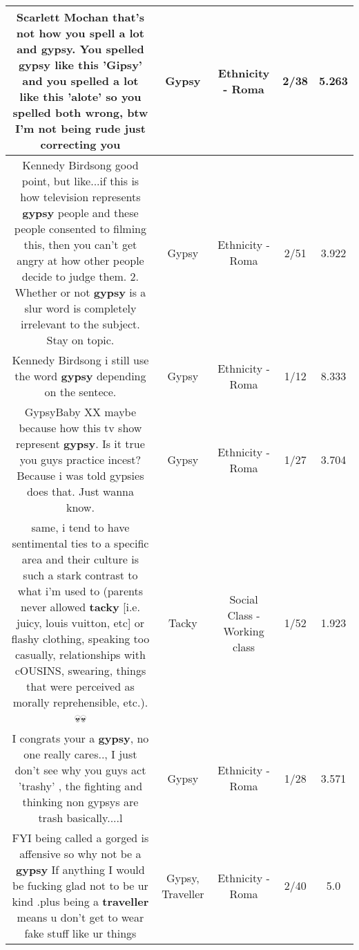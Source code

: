 \documentclass[11pt]{article}
\newlength\mylength
\begin{document}
\begin{center}
\begin{longtable}{|C{.65\mylength}|C{.30\mylength}|C{.12\mylength}|C{.12\mylength}|C{.12\mylength}|}
  \small Scarlett Mochan that's not how you spell a lot and \textbf{gypsy}. You spelled \textbf{gypsy} like this 'Gipsy' and you spelled a lot like this 'alote' so you spelled both wrong, btw I'm not being rude just correcting you\normalsize   & Gypsy & Ethnicity - Roma & 2/38 & 5.263 \\  \hline
  \small Kennedy Birdsong good point, but like...if this is how television represents \textbf{gypsy} people and these people consented to filming this, then you can't get angry at how other people decide to judge them. 2. Whether or not \textbf{gypsy} is a slur word is completely irrelevant to the subject. Stay on topic.\normalsize   & Gypsy & Ethnicity - Roma & 2/51 & 3.922 \\  \hline
  \small Kennedy Birdsong i still use the word \textbf{gypsy} depending on the sentece.\normalsize   & Gypsy & Ethnicity - Roma & 1/12 & 8.333 \\  \hline
  \small GypsyBaby XX maybe because how this tv show represent \textbf{gypsy}. Is it true you guys practice incest? Because i was told gypsies does that. Just wanna know.\normalsize   & Gypsy & Ethnicity - Roma & 1/27 & 3.704 \\  \hline
  \small same, i tend to have sentimental ties to a specific area and their culture is such a stark contrast to what i'm used to (parents never allowed \textbf{tacky} [i.e. juicy, louis vuitton, etc] or flashy clothing, speaking too casually, relationships with cOUSINS, swearing, things that were perceived as morally reprehensible, etc.). 💀💀\normalsize   & Tacky & Social Class - Working class & 1/52 & 1.923 \\  \hline
  \small I congrats your a \textbf{gypsy}, no one really cares.., I just don't see why you guys act 'trashy' , the fighting and thinking non gypsys are trash basically....l\normalsize   & Gypsy & Ethnicity - Roma & 1/28 & 3.571 \\  \hline
  \small FYI being called a gorged is affensive so why not be a \textbf{gypsy} If anything I would be fucking glad not to be ur kind .plus being a \textbf{traveller} means u don't get to wear fake stuff like ur things\normalsize   & Gypsy, Traveller & Ethnicity - Roma & 2/40 & 5.0 \\  \hline

\end{longtable}
\end{center}
\end{document}
